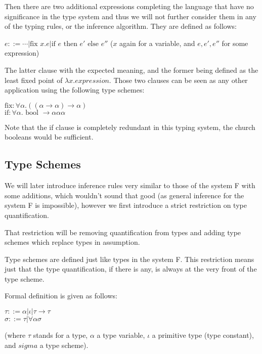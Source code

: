 Then there are two additional expressions completing the language that have no significance in the type system and thus we will not further consider them in any of the typing rules, or the inference algorithm. They are defined as follows: %

$e ::= \cdots | \text{fix } x . e | \text{if } e \text{ then } e' \text{ else } e''$
($x$ again for a variable, and $e, e', e''$ for some expression)

The latter clause with the expected meaning, and the former being defined as the least fixed point of $\lambda x . expression$. Those two clauses can be seen as any other application using the following type schemes:

$\text{fix}: \forall \alpha . ((\alpha \rightarrow \alpha) \rightarrow \alpha)$ \\
$\text{if}: \forall \alpha . \text{ bool } \rightarrow \alpha \alpha \alpha$

Note that the if clause is completely redundant in this typing system, the church booleans would be sufficient. %


\subsection{Type Schemes}

We will later introduce inference rules very similar to those of the system F with some additions, which wouldn't sound that good (as general inference for the system F is impossible), however we first introduce a strict restriction on type quantification.

That restriction will be removing quantification from types and adding type schemes which replace types in assumption.

Type schemes are defined just like types in the system F. This restriction means just that the type quantification, if there is any, is always at the very front of the type scheme.

Formal definition is given as follows:

$\tau ::= \alpha | \iota | \tau \rightarrow \tau$ \\
$\sigma ::= \tau | \forall \alpha \sigma$

(where $\tau$ stands for a type, $\alpha$ a type variable, $\iota$ a primitive type (type constant), and $sigma$ a type scheme). %

